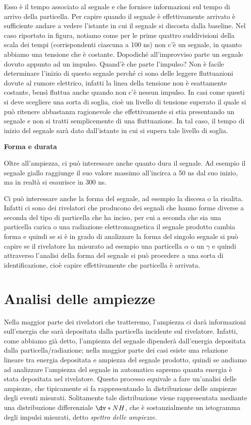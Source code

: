 Esso è il tempo associato al segnale e che fornisce informazioni sul tempo di arrivo della particella. Per capire quando il segnale è effettivamente arrivato è sufficiente andare a vedere l'istante in cui il segnale si discosta dalla baseline. Nel caso riportato in figura, notiamo come per le prime quattro suddivisioni della scala dei tempi (corrispondenti ciascuna a 100 ns) non c'è un segnale, in quanto abbiamo una tensione che è costante. Dopodiché all'improvviso parte un segnale dovuto appunto ad un impulso. Quand'è che parte l'impulso? Non è facile determinare l'inizio di questo segnale perché ci sono delle leggere fluttuazioni dovute al rumore elettrico, infatti la linea della tensione non è esattamente costante, bensì fluttua anche quando non c'è nessun impulso. In casi come questi si deve scegliere una sorta di soglia, cioè un livello di tensione superato il quale si può ritenere abbastanza ragionevole che effettivamente si stia presentando un segnale e non si tratti semplicemente di una fluttuazione. In tal caso, il tempo di inizio del segnale sarà dato dall'istante in cui si supera tale livello di soglia.

\vspace{0.2cm}\textbf{Forma e durata}

Oltre all'ampiezza, ci può interessare anche quanto dura il segnale. Ad esempio il segnale giallo raggiunge il suo valore massimo all'incirca a 50 ns dal suo inizio, ma in realtà si esaurisce in 300 ns.

Ci può interessare anche la forma del segnale, ad esempio la discesa o la risalita. Infatti ci sono dei rivelatori che producono dei segnali che hanno forme diverse a seconda del tipo di particella che ha inciso, per cui a seconda che sia una particella carica o una radiazione elettromagnetica il segnale prodotto cambia forma e quindi se si è in grado di analizzare la forma del singolo segnale si può capire se il rivelatore ha misurato ad esempio una particella $\alpha$ o un $\gamma$ e quindi attraverso l'analisi della forma del segnale si può procedere a una sorta di identificazione, cioè capire effettivamente che particella è arrivata.

\section{Analisi delle ampiezze}

Nella maggior parte dei rivelatori che tratteremo, l'ampiezza ci darà informazioni sull'energia che sarà depositata dalla particella incidente sul rivelatore. Infatti, come abbiamo già detto, l'ampiezza del segnale dipenderà dall'energia depositata dalla particella/radiazione; nella maggior parte dei casi esiste una relazione lineare tra energia depositata e ampiezza del segnale prodotto, quindi se andiamo ad analizzare l'ampiezza del segnale in automatico sapremo quanta energia è stata depositata nel rivelatore. Questo processo equivale a fare un'analisi delle ampiezze, che tipicamente si fa rappresentando la distribuzione delle ampiezze degli eventi misurati. Solitamente tale distribuzione viene rappresentata mediante una distribuzione differenziale $\dv*{N}{H}$, che è sostanzialmente un istogramma degli impulsi misurati, detto \textit{spettro delle ampiezze}.

